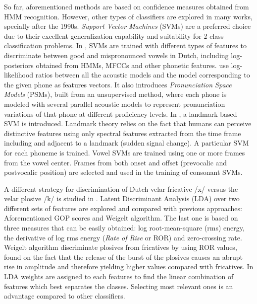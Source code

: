 So far, aforementioned methods are based on confidence measures obtained from HMM recognition. 
However, other types of classifiers are explored in many works, specially after
the 1990s. \textit{Support Vector Machines} (SVMs) are a preferred choice 
due to their excellent generalization capability and suitability for 2-class classification
problems. 
In \cite{detection_mispronunciation_dutch_vowel}, SVMs are trained with different types of
features to discriminate between good and mispronounced vowels in Dutch, including log-posteriors
obtained from HMMs, MFCCs and other phonetic features. \cite{svm_space_models} use 
log-likelihood ratios between all the acoustic models and the model corresponding to the given
phone as features vectors. It also introduces \textit{Pronunciation Space Models} (PSMs), 
built from an unsupervised method, where
each phone is modeled with several parallel acoustic models to represent pronunciation 
variations of that phone at different proficiency levels.
In \cite{landmark_svm}\cite{landmark_svm_2}, a landmark based 
SVM is introduced. Landmark theory relies on the fact that humans can perceive distinctive
features using only spectral features extracted from the time frame including and adjacent to
a landmark (sudden signal change). A particular SVM for each phoneme is trained. Vowel SVMs are 
trained using one or more frames from the vowel center. Frames from both onset and offset
(prevocalic and postvocalic position) are selected and used in the training of consonant
SVMs.

A different strategy for discrimination of Dutch velar fricative /x/ versus the velar plosive
/k/ is studied in \cite{lda_weigelt}. Latent Discriminant Analysis (LDA) over two different sets
of features are explored and compared with previous approaches: Aforementioned GOP scores and
Weigelt algorithm. The last one is based on three measures that can be easily obtained:
log root-mean-square (rms) energy, the derivative of log rms energy (\textit{Rate of Rise} or
ROR) and zero-crossing rate. Weigelt algorithm discriminate plosives from fricatives by using
ROR values, found on the fact that the release of the burst of the plosives causes an abrupt
rise in amplitude and therefore yielding higher values compared with fricatives.
In LDA weights are assigned to each features to find the linear combination of features
which best separates the classes. Selecting most relevant ones is an
advantage compared to other classifiers.

